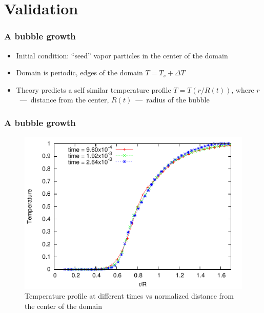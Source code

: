 \documentclass{beamer}
\begin{document}
\section{Validation}
\begin{frame}
  \frametitle{A bubble growth}
  \begin{itemize}
  \item Initial condition: ``seed'' vapor particles in the center of
    the domain
  \item Domain is periodic, edges of the domain $T=T_s +
    \Delta T$
  \item Theory predicts a self similar temperature profile $T =
    T(r/R(t))$, where $r$~---~distance from the center, $R(t)$~---~radius of
    the bubble
  \end{itemize}
\end{frame}

\begin{frame}
  \frametitle{A bubble growth}
  \begin{figure}
    \centering
    \includegraphics{gnuplot/self.pdf}
    \caption{Temperature profile at different times vs normalized
      distance from the center of the domain}
    \label{fig:self}
  \end{figure}
\end{frame}
\end{document}
